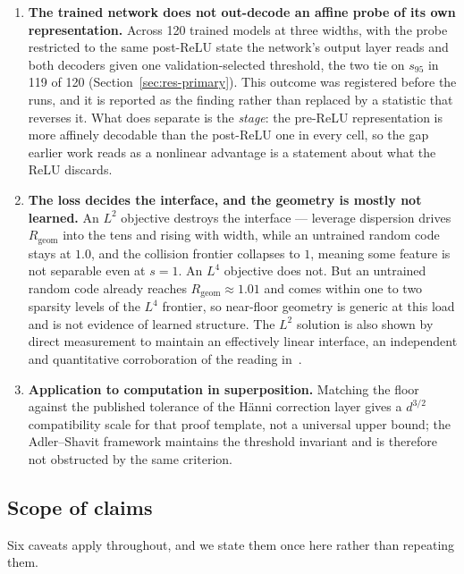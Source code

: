 \documentclass[preprint,12pt]{elsarticle}
\theoremstyle{definition}
\begin{document}
\begin{enumerate}[leftmargin=*]
\item \textbf{The trained network does not out-decode an affine probe of its own representation.}
Across 120 trained models at three widths, with the probe restricted to the same post-ReLU state the
network's output layer reads and both decoders given one validation-selected threshold, the two tie
on $s_{95}$ in 119 of 120 (Section~\ref{sec:res-primary}). This outcome was registered before the
runs, and it is reported as the finding rather than replaced by a statistic that reverses it. What
does separate is the \emph{stage}: the pre-ReLU representation is more affinely decodable than the
post-ReLU one in every cell, so the gap earlier work reads as a nonlinear advantage is a statement
about what the ReLU discards.

\item \textbf{The loss decides the interface, and the geometry is mostly not learned.} An $L^2$
objective destroys the interface --- leverage dispersion drives $R_{\mathrm{geom}}$ into the tens and
rising with width, while an untrained random code stays at $1.0$, and the collision frontier
collapses to $1$, meaning some feature is not separable even at $s=1$. An $L^4$ objective
does not. But an untrained random code already reaches $R_{\mathrm{geom}}\approx1.01$ and comes
within one to two sparsity levels of the $L^4$ frontier, so near-floor geometry is generic at this
load and is not evidence of learned structure. The $L^2$ solution is also shown by direct
measurement to maintain an effectively linear interface, an independent and quantitative
corroboration of the reading in~\cite{bhagat2026cc}.

\item \textbf{Application to computation in superposition.} Matching the floor against the
published tolerance of the H\"{a}nni correction layer gives a $d^{3/2}$ compatibility scale
for that proof template, not a universal upper bound; the Adler--Shavit framework maintains
the threshold invariant and is therefore not obstructed by the same criterion.

\end{enumerate}

\subsection{Scope of claims}
\label{sec:scope}

Six caveats apply throughout, and we state them once here rather than repeating them.
\end{document}
